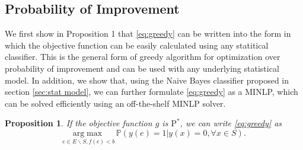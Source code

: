 \documentclass[12pt]{article}
\newcommand{\PI}{\text{P}^*}
\newtheorem{proposition}{Proposition}
\begin{document}
\subsection{Probability of Improvement}
We first show in Proposition 1 that \eqref{eq:greedy} can be written into the form in which the objective function can be easily calculated using any statitical classifier. This is the general form of greedy algorithm for optimization over probability of improvement and can be used with any underlying statistical model. In addition, we show that, using the Naive Bayes classifier proposed in section \ref{sec:stat model}, we can further formulate \eqref{eq:greedy} as a MINLP, which can be solved efficiently using an off-the-shelf MINLP solver.
\begin{proposition}
  If the objective function $g$ is $\PI$, we can write \eqref{eq:greedy} as 
  \begin{equation} \label{eq:PI3}
    \underset{e \in E \backslash S, f(e)<b}{\mathrm{arg}\max} \, \mathbb{P}(y(e)=1|y(x)=0, \forall x \in S).
  \end{equation}
\end{proposition}
\end{document}
